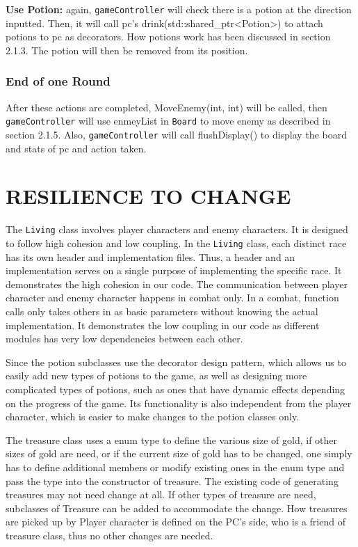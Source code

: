 \documentclass[11pt]{article}
\theoremstyle{plain} \newtheorem{theorem*}{Theorem}[subsection]
\begin{document}
\textbf{Use Potion:} again, \texttt{gameController} will check there is a potion
at the direction inputted. Then, it will call \textsf{pc}'s
\textsf{drink(std::shared\_ptr<Potion>)} to attach potions to \textsf{pc} as 
decorators. How potions work has been discussed in section 2.1.3. The potion
will then be removed from its position. 

\subsubsection{End of one Round}

After these actions are completed, \textsf{MoveEnemy(int, int)} will be called, 
then \texttt{gameController} will use \textsf{enmeyList} in \texttt{Board}
to move enemy as described in section 2.1.5. Also, \texttt{gameController}
will call \textsf{flushDisplay()} to display the board and stats of pc and
action taken.


\newpage


\section{RESILIENCE TO CHANGE}

The \texttt{Living} class involves player characters and enemy characters. 
It is designed to follow high cohesion and low coupling. 
In the \texttt{Living} class, each distinct race has its own header and 
implementation files. Thus, a header and an
implementation serves on a single purpose of implementing the specific race. It
demonstrates the high cohesion in our code. The communication between player
character and enemy character happens in combat only. In a combat, function
calls only takes others in as basic parameters without knowing the actual
implementation. It demonstrates the low coupling in our code as different
modules has very low dependencies between each other. 

Since the potion subclasses use the decorator design pattern, which allows us
to easily add new types of potions to the game, as well as designing more
complicated types of potions, such as ones that have dynamic effects depending
on the progress of the game. Its functionality is also independent from the
player character, which is easier to make changes to the potion classes only. 

The treasure class uses a enum type to define the various size of gold, if
other sizes of gold are need, or if the current size of gold has to be changed,
one simply has to define additional members or modify existing ones in the enum
type and pass the type into the constructor of treasure. The existing code of
generating treasures may not need change at all. If other types of treasure are
need, subclasses of Treasure can be added to accommodate the change. How
treasures are picked up by Player character is defined on the PC’s side, who is
a friend of treasure class, thus no other changes are needed. 
\end{document}
